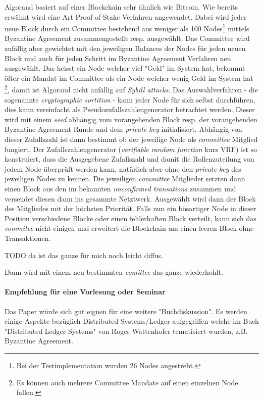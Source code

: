 \documentclass[11pt,a4paper]{article}
\begin{document}
Algorand basiert auf einer Blockchain sehr \"ahnlich wie Bitcoin.
Wie bereits erw\"ahnt wird eine Art Proof-of-Stake Verfahren angewendet.
Dabei wird jeder neue Block durch ein Committee bestehend aus weniger als 100 Nodes\footnote{Bei der Testimplementation wurden 26 Nodes angestrebt.} mittels Byzantine Agreement zusammengestellt resp. ausgewählt.
Das Committee wird zufällig aber gewichtet mit den jeweiligen Balances der Nodes für jeden neuen Block und auch für jeden Schritt im Byzantine Agreement Verfahren neu ausgew\"ahlt.
Das heisst ein Node welcher viel "Geld" im System hat, bekommt \"ofter ein Mandat im Committee als ein Node welcher wenig Geld im System hat \footnote{Es k\"onnen auch mehrere Committee Mandate auf einen einzelnen Node fallen.}, damit ist Algorand nicht anf\"allig auf \textit{Sybill attacks}.
Das Auswahlverfahren - die sogenannte \textit{cryptographic sortition} - kann jeder Node für sich selbst durchführen, dies kann vereinfacht als Pseudozufallszahlengenerator betrachtet werden.
Dieser wird mit einem \textit{seed} abhängig vom vorangehenden Block resp. der vorangehenden Byzantine Agreement Runde und dem \textit{private key} initialisiert.
Abh\"angig von dieser Zufallszahl ist dann bestimmt ob der jeweilige Node als \textit{committee} Mitglied fungiert.
Der Zufallszahlengenerator (\textit{verifiable random function} kurz VRF) ist so konstruiert,
dass die Ausgegebene Zufallszahl und damit die Rollenzuteilung von jedem Node \"uberpr\"uft werden kann,
nat\"urlich aber ohne den \textit{private key} des jeweiligen Nodes zu kennen.
Die jeweiligen \textit{committee} Mitglieder setzten dann einen Block aus den im bekannten \textit{unconfirmed transations} zusammen und versendet diesen dann ins gesammte Netztwerk.
Ausgewählt wird dann der Block des Mitgliedes mit der höchsten Priorität.
Falls nun ein b\"osartiger Node in dieser Position verschiedene Bl\"ocke oder einen fehlerhaften Block
verteilt, kann sich das \textit{commitee} nicht einigen und erweitert die Blockchain um einen leeren Block ohne Transaktionen.

TODO da ist das ganze für mich noch leicht diffus.

Dann wird mit einem neu bestimmten \textit{comittee} das ganze wiederhohlt.

\paragraph*{Empfehlung f\"ur eine Vorlesung oder Seminar}
Das Paper \cite{Gilad:2017:ASB:3132747.3132757} w\"urde sich gut eignen f\"ur eine weitere "Buchdiskussion".
Es werden einige Aspekte bez\"uglich Distributed Systems/Ledger aufgegriffen welche 
im Buch "Distributed Ledger Systems" von Roger Wattenhofer tematisiert wurden, z.B. Byzantine Agreement.
\end{document}
